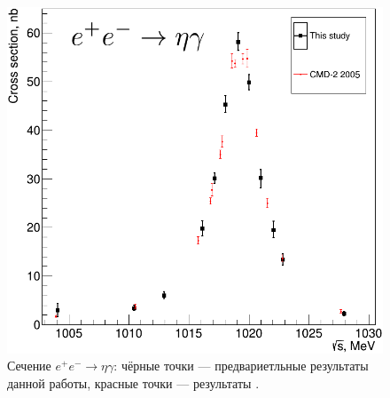 \begin{figure}[htbp]
\begin{minipage}[T]{.48\textwidth}
		\includegraphics[width=\textwidth]{img/cs_etag_at_phi.png}
		\caption{Сечение $e^+ e^- \to \eta \gamma$:
			чёрные точки --- предвариетльные результаты данной работы,
			красные точки --- результаты \cite{Akhmetshin:2004gw}.}\label{fig:cs_etag_mine}
	\end{minipage}
\end{figure}



